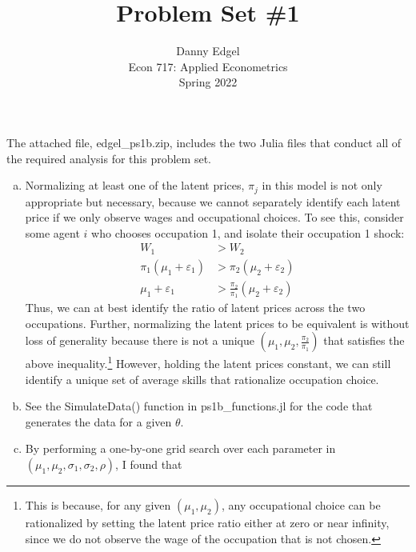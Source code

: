 \documentclass{article}
\begin{document}
\title{	Problem Set \#1 }
\author{ 	Danny Edgel 			\\ 
		    Econ 717: Applied Econometrics	\\
		    Spring 2022						
		}
\maketitle\thispagestyle{empty}


\noindent The attached file, edgel\_ps1b.zip, includes the two Julia files that conduct all of the required analysis for this problem set.

\begin{enumerate}[a)]
        \item Normalizing at least one of the latent prices, $\pi_j$ in this model is not only appropriate but necessary, because we cannot separately identify each latent price if we only observe wages and occupational choices. To see this, consider some agent $i$ who chooses occupation 1, and isolate their occupation 1 shock:
        \begin{align*}
                W_1 &> W_2 \\
                \pi_1(\mu_1 + \varepsilon_1) &> \pi_2(\mu_2 + \varepsilon_2) \\
                \mu_1 + \varepsilon_1 &> \frac{\pi_2}{\pi_1}(\mu_2 + \varepsilon_2)
        \end{align*}
        Thus, we can at best identify the ratio of latent prices across the two occupations. Further, normalizing the latent prices to be equivalent is without loss of generality because there is not a unique $(\mu_1,\mu_2, \frac{\pi_2}{\pi_1})$ that satisfies the above inequality.\footnote{This is because, for any given $(\mu_1,\mu_2)$, any occupational choice can be rationalized by setting the latent price ratio either at zero or near infinity, since we do not observe the wage of the occupation that is not chosen.} However, holding the latent prices constant, we can still identify a unique set of average skills that rationalize occupation choice.

        \item See the SimulateData() function in ps1b\_functions.jl for the code that generates the data for a given $\theta$.
        
        \item By performing a one-by-one grid search over each parameter in $(\mu_1, \mu_2, \sigma_1, \sigma_2, \rho)$, I found that 
        

\end{enumerate}
\end{document}
